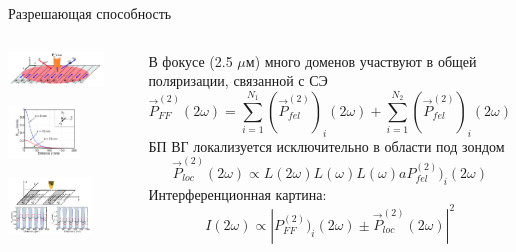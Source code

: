 \documentclass[9pt, compress, xcolor=table]{beamer}
\begin{document}
\begin{frame}{Разрешающая способность}

\begin{columns}
\column{6.5cm}
\begin{center}
\includegraphics[width=0.8\textwidth]{shg23}

\includegraphics[width=0.6\textwidth]{shg25}

\includegraphics[width=0.7\textwidth]{shg24}
\end{center}

\column{6cm}

В фокусе (2.5 $\mu$м) много доменов участвуют в общей поляризации, связанной с СЭ
\begin{equation*}
\vec P^{(2)}_{FF}(2\omega) = \sum_{i=1}^{N_1}(\vec P^{(2)}_{fel})_i(2\omega)+ \sum_{i=1}^{N_2}(\vec P^{(2)}_{fel})_i(2\omega)
\end{equation*}
БП ВГ локализуется исключительно в области под зондом
\begin{equation*}
\vec P^{(2)}_{loc}(2\omega) \propto L(2\omega)L(\omega)L(\omega)a P^{(2)}_{fel})_i(2\omega)
\end{equation*}
Интерференционная картина:
\begin{equation*}
I(2\omega) \propto \left|P^{(2)}_{FF})_i(2\omega) \pm \vec P^{(2)}_{loc}(2\omega)\right|^2
\end{equation*}


\end{columns}
\end{frame}
\end{document}
